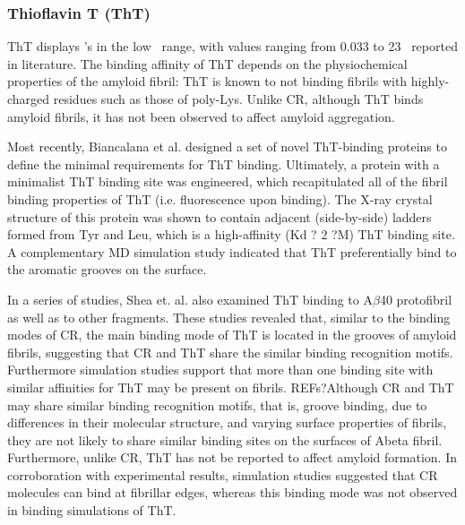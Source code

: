 \subsubsection{Thioflavin T (ThT)}
ThT displays \KD's  in the low \micromolar\ range, with values ranging from 0.033 to 23 \micromolar\ reported in literature.\cite{Groenning:2009p2723} The binding affinity of ThT depends on the physiochemical properties of the amyloid fibril: ThT is known to not binding fibrils with highly-charged residues such as those of poly-Lys.\cite{Sabate:2008hb,Khurana:2003dk} Unlike CR, although ThT binds amyloid fibrils, it has not been observed to affect amyloid aggregation.  

Most recently,  Biancalana et al.\cite{Biancalana:2009p5056} designed a set of novel ThT-binding proteins to define the minimal requirements for ThT binding. Ultimately, a protein with a minimalist ThT binding site was engineered, which recapitulated all of the fibril binding properties of ThT (i.e. fluorescence upon binding).\cite{Biancalana:2010p5053} The X-ray crystal structure of this protein was shown to contain adjacent (side-by-side) ladders formed from Tyr and Leu, which is a high-affinity (Kd ? 2 ?M) ThT binding site.\cite{Biancalana:2010p5053}  A complementary MD simulation study indicated that ThT preferentially bind to the aromatic grooves on the surface.\cite{Wu:2009p1954}

In a series of studies, Shea et. al. also examined ThT binding to A$\beta$40 protofibril\cite{Wu:2011fd} as well as to other fragments.\cite{Wu:2008ds,Wu:2009p1954}  These studies revealed that, similar to the binding modes of CR, the main binding mode of ThT is located in the grooves of amyloid fibrils, suggesting that CR and ThT share the similar binding recognition motifs.  Furthermore simulation studies support that more than one binding site with similar affinities for ThT may be present on fibrils. REFs?Although CR and ThT may share similar binding recognition motifs, that is, groove binding, due to differences in their molecular structure, and varying surface properties of fibrils, they are not likely to share similar binding sites on the surfaces of Abeta fibril. Furthermore, unlike CR, ThT has not be reported to affect amyloid formation. In corroboration with experimental results, simulation studies suggested that CR molecules can bind at fibrillar edges,\cite{Shea:2012eh} whereas this binding mode was not observed in binding simulations of ThT. %

